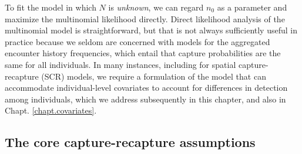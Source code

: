 To fit the model in which $N$ is {\it unknown}, we can regard $n_{0}$ as a
parameter and maximize the multinomial likelihood directly.
Direct likelihood analysis of the multinomial model is
straightforward, but that is not always sufficiently useful in practice
because we seldom are concerned with models for the aggregated
encounter history frequencies, which entail that capture probabilities are the
same for all individuals. In many instances, including for
spatial capture-recapture (SCR) models, we require a formulation of
the model that can accommodate individual-level
covariates to account for
differences in detection among individuals, which we
address subsequently in this chapter, and also in Chapt. \ref{chapt.covariates}.



\subsection{The core capture-recapture assumptions}

